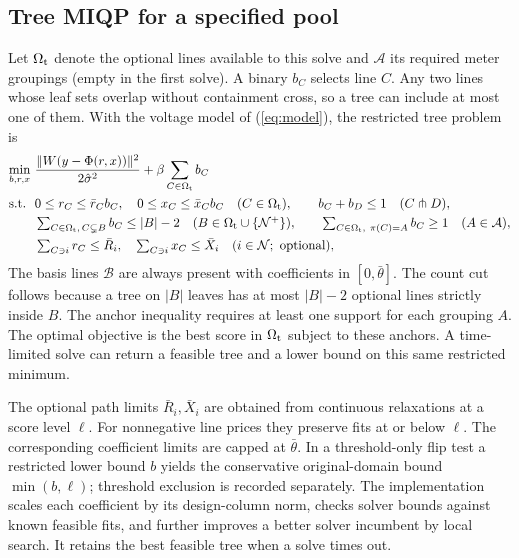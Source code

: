 \documentclass[journal,onecolumn,11pt]{IEEEtran}
\newcommand{\Nset}{\mathcal{N}}
\newcommand{\Bset}{\mathcal{B}}
\newcommand{\Aset}{\mathcal{A}}
\newcommand{\cross}{\pitchfork}
\begin{document}
\subsection{Tree MIQP for a specified pool}
Let $\Omega_{\rm t}$ denote the optional lines available to this solve and $\Aset$ its required meter groupings
(empty in the first solve). A binary $b_C$ selects line $C$. Any two lines whose leaf sets overlap without
containment cross, so a tree can include at most one of them. With the voltage model of (\ref{eq:model}), the
restricted tree problem is
\begin{equation}\label{eq:master}
\begin{aligned}
\min_{b,r,x}\ &\frac{\|W(y-\Phi(r,x))\|^2}{2\hat\sigma^2}+\beta\sum_{C\in\Omega_{\rm t}}b_C\\
\text{s.t.}\ \ &0\le r_C\le\bar r_Cb_C,\quad0\le x_C\le\bar x_Cb_C\quad(C\in\Omega_{\rm t}),\qquad b_C+b_D\le1\quad(C\cross D),\\
&\textstyle\sum_{C\in\Omega_{\rm t},\,C\subsetneq B}b_C\le|B|-2\quad(B\in\Omega_{\rm t}\cup\{\Nset^+\}),\qquad
\sum_{C\in\Omega_{\rm t},\ \pi(C)=A}b_C\ge1\quad(A\in\Aset),\\
&\textstyle\sum_{C\ni i}r_C\le\bar R_i,\quad\sum_{C\ni i}x_C\le\bar X_i\quad(i\in\Nset;\ \text{optional}),
\end{aligned}
\end{equation}
The basis lines $\Bset$ are always present with coefficients in $[0,\bar\theta]$.
The count cut follows because a tree on $|B|$ leaves has at most $|B|-2$ optional lines strictly inside $B$.
The anchor inequality requires at least one support for each grouping $A$. The optimal objective is the best
score in $\Omega_{\rm t}$ subject to these anchors. A time-limited solve can return a feasible tree and a lower
bound on this same restricted minimum.

The optional path limits $\bar R_i,\bar X_i$ are obtained from continuous relaxations at a score level $\ell$.
For nonnegative line prices they preserve fits at or below $\ell$. The corresponding coefficient limits are capped
at $\bar\theta$. In a threshold-only flip test a restricted lower bound $b$ yields the conservative original-domain
bound $\min(b,\ell)$; threshold exclusion is recorded separately. The implementation scales each coefficient
by its design-column norm, checks solver bounds against known feasible fits, and further improves a better solver
incumbent by local search. It retains the best feasible tree when a solve times out.
\end{document}

